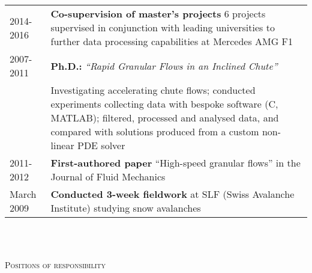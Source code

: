 \documentclass[a4paper,10pt]{article}
\newcommand{\lineunder}{\vspace*{0.2cm} \\ \hspace*{-20pt} \hrulefill \\ \vspace{-0.9cm}}
\newcommand{\header}[1]{{\hspace*{-17pt}\vspace*{6pt} \large{\textsc{#1}}}}
\begin{document}
\begin{tabular}{p{0.8in}p{5.3in}}
2014-2016 & \textbf{Co-supervision of master's projects} 6 projects supervised in conjunction with leading universities to further data processing capabilities at Mercedes AMG F1 \\
2007-2011 & \textbf{Ph.D.:} \textit{``Rapid Granular Flows in an Inclined Chute''}  \\
 & Investigating accelerating chute flows; conducted experiments collecting data with bespoke software (C, MATLAB); filtered, processed and analysed data, and compared with solutions produced from a custom non-linear PDE solver \\
2011-2012 & \textbf{First-authored paper}  ``High-speed granular flows'' in the Journal of Fluid Mechanics\\
March 2009 & \textbf{Conducted 3-week fieldwork} at SLF (Swiss Avalanche Institute) studying snow avalanches \\

\end{tabular}
\newline
\vspace{0.2cm}
\lineunder

\header{Positions of responsibility}
\end{document}
